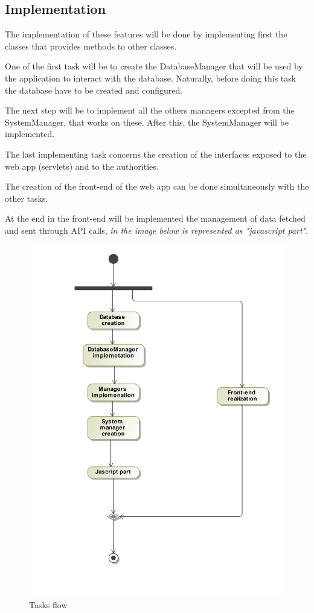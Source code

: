 \subsection{Implementation}
The implementation of these features will be done by implementing first the classes that provides methods to other classes.

One of the first task will be to create the DatabaseManager that will be used by the application to interact with the database. 
Naturally, before doing this task the database  have to be created and configured.

The next step will be to implement all the others managers excepted from the SystemManager, that works on these.
After this, the SystemManager will be implemented. 

The last implementing task concerns the creation of the interfaces exposed to the web app (servlets) and to the authorities.

The creation of the front-end of the web app can be done simultaneously with the other tasks.

At the end in the front-end will be implemented the management of data fetched and sent through API calls, \textit{in the image below is represented as "javascript part"}.

\newpage

\begin{figure}[H]
	\centering
	\includegraphics[width=0.7\linewidth]{Images/Tasks}
	\caption{Tasks flow}
	\label{Tasks flow}
\end{figure}

